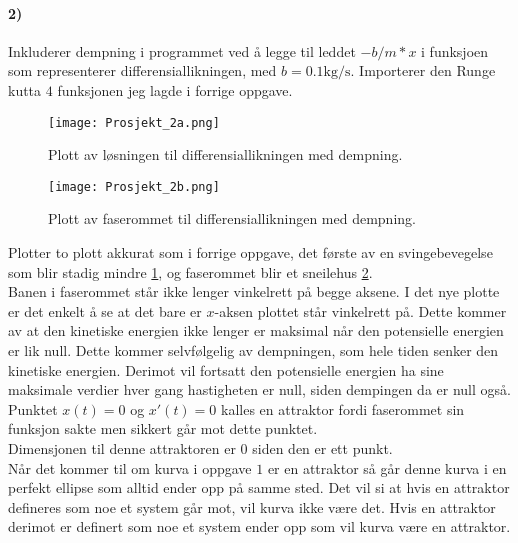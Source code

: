 \documentclass[11pt, A4paper,norsk]{article}
\begin{document}
		\paragraph{2)}
			\begin{flushleft}
Inkluderer dempning i programmet ved å legge til leddet $- b / m * x$ i funksjoen som representerer differensiallikningen, med $b = 0.1 \text{kg/s}$. Importerer den Runge kutta $4$ funksjonen jeg lagde i forrige oppgave.
			\end{flushleft}
			\begin{figure}[H]
\texttt{[image: Prosjekt\_2a.png]}
\caption{Plott av løsningen til differensiallikningen med dempning.}
\label{2a}
			\end{figure}
			\begin{figure}[H]
\texttt{[image: Prosjekt\_2b.png]}
\caption{Plott av faserommet til differensiallikningen med dempning.}
\label{2b}
			\end{figure}
			\begin{flushleft}
Plotter to plott akkurat som i forrige oppgave, det første av en svingebevegelse som blir stadig mindre \ref{2a}, og faserommet blir et sneilehus \ref{2b}. \\

Banen i faserommet står ikke lenger vinkelrett på begge aksene. I det nye plotte er det enkelt å se at det bare er $x$-aksen plottet står vinkelrett på. Dette kommer av at den kinetiske energien ikke lenger er maksimal når den potensielle energien er lik null. Dette kommer selvfølgelig av dempningen, som hele tiden senker den kinetiske energien. Derimot vil fortsatt den potensielle energien ha sine maksimale verdier hver gang hastigheten er null, siden dempingen da er null også. \\
Punktet $x(t) = 0$ og $x'(t) = 0$ kalles en attraktor fordi faserommet sin funksjon sakte men sikkert går mot dette punktet. \\

Dimensjonen til denne attraktoren er $0$ siden den er ett punkt. \\

Når det kommer til om kurva i oppgave $1$ er en attraktor så går denne kurva i en perfekt ellipse som alltid ender opp på samme sted. Det vil si at hvis en attraktor defineres som noe et system går mot, vil kurva ikke være det. Hvis en attraktor derimot er definert som noe et system ender opp som vil kurva være en attraktor.
			\end{flushleft}
\end{document}
